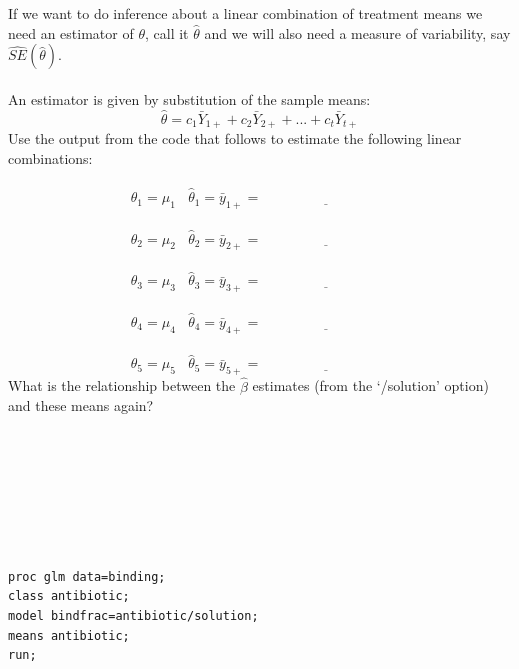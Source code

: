If we want to do inference about a linear combination of treatment means we need an estimator of $\theta$, call it $\hat{\theta}$ and we will also need a measure of variability, say $\hat{SE}(\hat{\theta})$.\\~\\
An estimator is given by substitution of the sample means: 
    $$\hat{\theta}=c_{1}\bar{Y}_{1+}+c_{2}\bar{Y}_{2+}+...+c_{t}\bar{Y}_{t+}$$
 Use the output from the code that follows to estimate the following linear combinations:  \\~\\
    $$\theta_1=\mu_1~~~~\hat{\theta}_1=\bar{y}_{1+}=\underline{~~~~~~~~~~~~~~~~~~~~~~~~~~~~~~~~~~~~~~~~~}$$~\\
    $$\theta_2=\mu_2~~~~\hat{\theta}_2=\bar{y}_{2+}=\underline{~~~~~~~~~~~~~~~~~~~~~~~~~~~~~~~~~~~~~~~~~}$$~\\
    $$\theta_3=\mu_3~~~~\hat{\theta}_3=\bar{y}_{3+}=\underline{~~~~~~~~~~~~~~~~~~~~~~~~~~~~~~~~~~~~~~~~~}$$~\\
    $$\theta_4=\mu_4~~~~\hat{\theta}_4=\bar{y}_{4+}=\underline{~~~~~~~~~~~~~~~~~~~~~~~~~~~~~~~~~~~~~~~~~}$$~\\
    $$\theta_5=\mu_5~~~~\hat{\theta}_5=\bar{y}_{5+}=\underline{~~~~~~~~~~~~~~~~~~~~~~~~~~~~~~~~~~~~~~~~~}$$
What is the relationship between the $\hat{\beta}$ estimates (from the `/solution' option) and these means again?\\~\\~\\~\\~\\~\\~\\~\\
\begin{small}
\begin{verbatim}
proc glm data=binding;
class antibiotic;
model bindfrac=antibiotic/solution;
means antibiotic;
run;
\end{verbatim}
\end{small}
